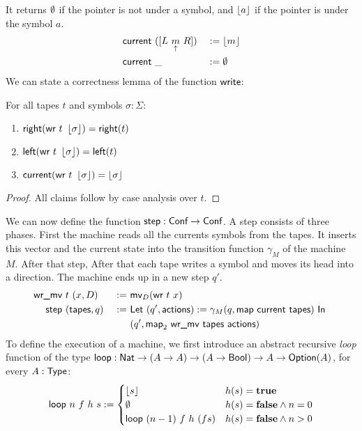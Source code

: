 \documentclass{psartcl}
\begin{document}
It returns $\emptyset$ if the pointer is not under a symbol, and $\left\lfloor {a}\right\rfloor$ if the pointer is under the symbol $a$.
\begin{alignat*}{2}
  \textsf{current}&~([ L~\underset{\uparrow}{m}~R ])&&:= \left\lfloor {m}\right\rfloor \\
  \textsf{current}&~\_                 &&:= \emptyset
\end{alignat*}
We can state a correctness lemma of the function $\textsf{write}$:
\begin{lemma}[Write]
  \label{lem:write}
  For all tapes $t$ and symbols $\sigma:\Sigma$:
  \begin{enumerate}
    \item $\textsf{right}   (\textsf{wr}~t~\left\lfloor {\sigma}\right\rfloor) = \textsf{right}(t)$
    \item $\textsf{left}    (\textsf{wr}~t~\left\lfloor {\sigma}\right\rfloor) = \textsf{left} (t)$
    \item $\textsf{current} (\textsf{wr}~t~\left\lfloor {\sigma}\right\rfloor) = \left\lfloor {\sigma}\right\rfloor$
  \end{enumerate}
\end{lemma}
\begin{proof}
  All claims follow by case analysis over $t$.
\end{proof}
We can now define the function $\textsf{step} : \textsf{Conf} \rightarrow \textsf{Conf}$.  A step consists of three phases.  First the machine reads all the currents
symbols from the tapes.  It inserts this vector and the current state into the transition function $\gamma_M$ of the machine $M$.  After that step,
After that each tape writes a symbol and moves its head into a direction.  The machine ends up in a new step $q'$.
\begin{alignat*}{2}
  \textsf{wr\_mv}&~t~(x, D)        &~:=~& \textsf{mv}_D (\textsf{wr}~t~x) \\
    \textsf{step}&~(\textsf{tapes}, q) &~:=~& \textsf{Let}~(q', \textsf{actions}) := \gamma_M(q, \textsf{map}~\textsf{current}~\textsf{tapes})~\textsf{In}~ \\
             &                 &~  ~& (q', \textsf{map}_2~\textsf{wr\_mv}~\textsf{tapes}~\textsf{actions})
\end{alignat*}
To define the execution of a machine, we first introduce an abstract recursive \emph{loop} function of the type
$\textsf{loop} : \textsf{Nat} \rightarrow (A \rightarrow A) \rightarrow (A \rightarrow \textsf{Bool}) \rightarrow A \rightarrow \textsf{Option}(A)$, for every $A:\textsf{Type}$:
\begin{align*}
  \textsf{loop}~n~f~h~s :=
  \begin{cases}
    \left\lfloor {s}\right\rfloor              & h(s) = \mathbf{true} \\
    \emptyset                 & h(s) = \mathbf{false} \land n = 0 \\
    \textsf{loop}~(n-1)~f~h~(f s)  & h(s) = \mathbf{false} \land n > 0
  \end{cases}
\end{align*}
\end{document}
